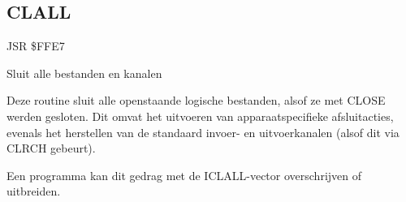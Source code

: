\subsection{CLALL}
\label{KERNAL Jump Table!CLALL}
\begin{description}[leftmargin=2cm,style=nextline]
    \item [Adres:] JSR \$FFE7    \item [Omschrijving:] Sluit alle bestanden en kanalen    \item [Opmerkingen:]        Deze routine sluit alle openstaande logische bestanden, alsof ze met CLOSE werden gesloten. Dit omvat het uitvoeren van apparaatspecifieke afsluitacties, evenals het herstellen van de standaard invoer- en uitvoerkanalen (alsof dit via CLRCH gebeurt).

        Een programma kan dit gedrag met de ICLALL-vector overschrijven of uitbreiden.    \item [Voorbeeld:]
\end{description}



\newpage
